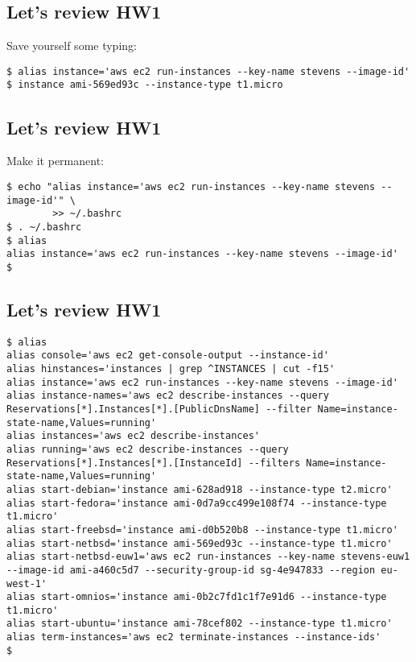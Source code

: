 \documentclass[xga]{xdvislides}
\begin{document}
\subsection{Let's review HW1}
\vspace{.5in}

Save yourself some typing:
\begin{verbatim}
$ alias instance='aws ec2 run-instances --key-name stevens --image-id'
$ instance ami-569ed93c --instance-type t1.micro
\end{verbatim}

\subsection{Let's review HW1}
\vspace{.5in}

Make it permanent:
\begin{verbatim}
$ echo "alias instance='aws ec2 run-instances --key-name stevens --image-id'" \
        >> ~/.bashrc
$ . ~/.bashrc
$ alias
alias instance='aws ec2 run-instances --key-name stevens --image-id'
$ 
\end{verbatim}

\subsection{Let's review HW1}
\begin{verbatim}
$ alias
alias console='aws ec2 get-console-output --instance-id'
alias hinstances='instances | grep ^INSTANCES | cut -f15'
alias instance='aws ec2 run-instances --key-name stevens --image-id'
alias instance-names='aws ec2 describe-instances --query Reservations[*].Instances[*].[PublicDnsName] --filter Name=instance-state-name,Values=running'
alias instances='aws ec2 describe-instances'
alias running='aws ec2 describe-instances --query Reservations[*].Instances[*].[InstanceId] --filters Name=instance-state-name,Values=running'
alias start-debian='instance ami-628ad918 --instance-type t2.micro'
alias start-fedora='instance ami-0d7a9cc499e108f74 --instance-type t1.micro'
alias start-freebsd='instance ami-d0b520b8 --instance-type t1.micro'
alias start-netbsd='instance ami-569ed93c --instance-type t1.micro'
alias start-netbsd-euw1='aws ec2 run-instances --key-name stevens-euw1 --image-id ami-a460c5d7 --security-group-id sg-4e947833 --region eu-west-1'
alias start-omnios='instance ami-0b2c7fd1c1f7e91d6 --instance-type t1.micro'
alias start-ubuntu='instance ami-78cef802 --instance-type t1.micro'
alias term-instances='aws ec2 terminate-instances --instance-ids'
$ 
\end{verbatim}
\end{document}
